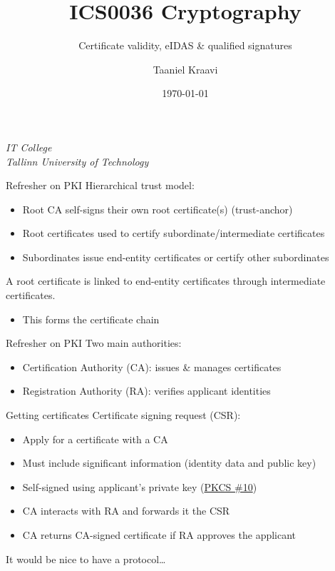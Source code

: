 \usepackage{tikz}

\newlength{\offset}

\title{ICS0036 Cryptography}
\subtitle{Certificate validity, eIDAS \& qualified signatures}
\date{\today}
\author{Taaniel Kraavi}
\institute%
{%
  \textit{IT College}\\
  \textit{Tallinn University of Technology}
}


\begin{frame}
  \titlepage
\end{frame}

\begin{frame}{Refresher on PKI}
  Hierarchical trust model:
  \begin{itemize}[<+(1)->]
    \item Root CA self-signs their own root certificate(s) (trust-anchor)
    \item Root certificates used to certify subordinate/intermediate certificates
    \item Subordinates issue end-entity certificates or certify other subordinates
  \end{itemize}

  \vspace*{1em}

  \pause
  A root certificate is linked to end-entity certificates through intermediate certificates.
  \begin{itemize}[<+(1)->]
    \item This forms the certificate chain
  \end{itemize}
\end{frame}

\begin{frame}{Refresher on PKI}
  Two main authorities:
  \begin{itemize}[<+(1)->]
    \item Certification Authority (CA): issues \& manages certificates
    \item Registration Authority (RA): verifies applicant identities
  \end{itemize}
\end{frame}

\begin{frame}{Getting certificates}
  \pause
  Certificate signing request (CSR):
  \begin{itemize}[<+(1)->]
    \item Apply for a certificate with a CA
    \item Must include significant information (identity data and public key)
    \item Self-signed using applicant's private key (\href{https://datatracker.ietf.org/doc/html/rfc2986}{PKCS \#10})
    \item CA interacts with RA and forwards it the CSR
    \item CA returns CA-signed certificate if RA approves the applicant
  \end{itemize}

  \vspace*{1em}

  \pause
  It would be nice to have a protocol\dots
\end{frame}

